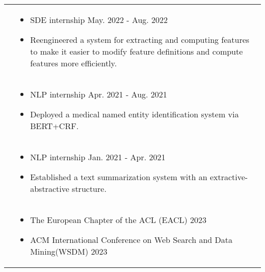 \documentclass[letterpaper, 10pt]{article}
\begin{document}
\begin{longtable}{p{1.3in}p{4.8in}}

{\color{black}{Industry Experience}} 

&  \begin{itemize}[leftmargin=10pt, itemsep=-5pt, topsep=0pt,before=\textbf{Lime}]
    \item SDE internship \hfill May. 2022 - Aug. 2022 
    \item Reengineered a system for extracting and computing features to make it easier to modify feature definitions and compute features more efficiently.
  \end{itemize}\\ 

  

&  \begin{itemize}[leftmargin=10pt, itemsep=-5pt, topsep=0pt,before=\textbf{Umer Technology}]
    \item NLP internship \hfill Apr. 2021 - Aug. 2021 
    \item  Deployed a medical named entity identification system via BERT+CRF.
  \end{itemize}\\ 

&  \begin{itemize}[leftmargin=10pt, itemsep=-5pt, topsep=0pt,before=\textbf{Transwarp}]
    \item NLP internship \hfill Jan. 2021 - Apr. 2021 
    \item  Established a text summarization system with an extractive-abstractive structure.
  \end{itemize}\\ 


{\color{black}{Professional service}}
&  \begin{itemize}[leftmargin=10pt,topsep=0pt,before=\textbf{Program Committee}]
    \item The European Chapter of the ACL (EACL) \hfill 2023
    \item ACM International Conference on Web Search and Data Mining(WSDM) \hfill 2023
  \end{itemize}\\ 



\end{longtable}
\end{document}
